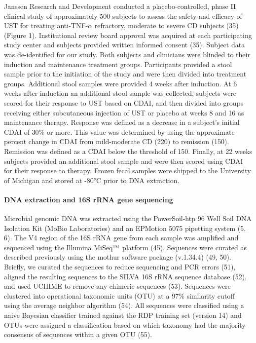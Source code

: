 \documentclass[12pt,]{article}
\let\oldparagraph\paragraph
\renewcommand{\paragraph}[1]{\oldparagraph{#1}\mbox{}}
\begin{document}
Janssen Research and Development conducted a placebo-controlled, phase
II clinical study of approximately 500 subjects to assess the safety and
efficacy of UST for treating anti-TNF-\({\alpha}\) refractory, moderate
to severe CD subjects (35) (Figure 1). Institutional review board
approval was acquired at each participating study center and subjects
provided written informed consent (35). Subject data was de-identified
for our study. Both subjects and clinicians were blinded to their
induction and maintenance treatment groups. Participants provided a
stool sample prior to the initiation of the study and were then divided
into treatment groups. Additional stool samples were provided 4 weeks
after induction. At 6 weeks after induction an additional stool sample
was collected, subjects were scored for their response to UST based on
CDAI, and then divided into groups receiving either subcutaneous
injection of UST or placebo at weeks 8 and 16 as maintenance therapy.
Response was defined as a decrease in a subject's initial CDAI of 30\%
or more. This value was determined by using the approximate percent
change in CDAI from mild-moderate CD (220) to remission (150). Remission
was defined as a CDAI below the threshold of 150. Finally, at 22 weeks
subjects provided an additional stool sample and were then scored using
CDAI for their response to therapy. Frozen fecal samples were shipped to
the University of Michigan and stored at -80°C prior to DNA extraction.

\paragraph{DNA extraction and 16S rRNA gene
sequencing}\label{dna-extraction-and-16s-rrna-gene-sequencing}

Microbial genomic DNA was extracted using the PowerSoil-htp 96 Well Soil
DNA Isolation Kit (MoBio Laboratories) and an EPMotion 5075 pipetting
system (5, 6). The V4 region of the 16S rRNA gene from each sample was
amplified and sequenced using the Illumina
MiSeq\(\text{\texttrademark}\) platform (45). Sequences were curated as
described previously using the mothur software package (v.1.34.4) (49,
50). Briefly, we curated the sequences to reduce sequencing and PCR
errors (51), aligned the resulting sequences to the SILVA 16S rRNA
sequence database (52), and used UCHIME to remove any chimeric sequences
(53). Sequences were clustered into operational taxonomic units (OTU) at
a 97\% similarity cutoff using the average neighbor algorithm (54). All
sequences were classified using a naive Bayesian classifier trained
against the RDP training set (version 14) and OTUs were assigned a
classification based on which taxonomy had the majority consensus of
sequences within a given OTU (55).
\end{document}
